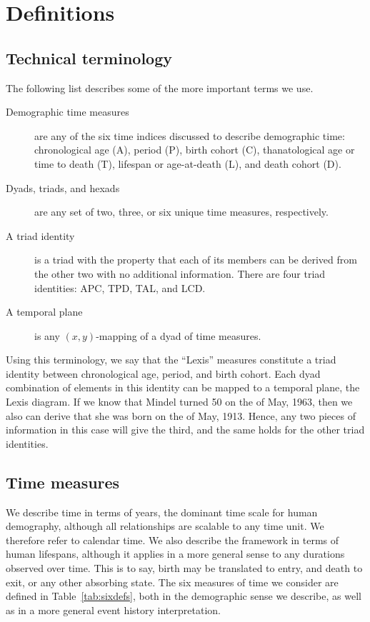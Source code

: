 \documentclass[12pt,oneside,a4paper,doublespacing]{article} %
\theoremstyle{definition}
\begin{document}
\section{Definitions}
\subsection{Technical terminology}
The following list describes some of the more important terms we use.
\begin{description}
\item[Demographic time measures] are any of the six time indices discussed to
describe demographic time: chronological age (A), period (P), birth cohort (C),
thanatological age or time to death (T), lifespan or age-at-death (L), and death
cohort (D).
\item[Dyads, triads, and hexads] are any set of two, three, or six unique time
measures, respectively.
\item[A triad identity] is a triad with the property that each of its members
can be derived from the other two with no additional information. There are four triad
identities: APC, TPD, TAL, and LCD.
\item[A temporal plane] is any $(x,y)$-mapping of a dyad of time measures.
\end{description}
Using this terminology, we say that the ``Lexis'' measures
constitute a triad identity between chronological age, period, and birth cohort. Each dyad
combination of elements in this identity can be mapped to a
temporal plane, the Lexis diagram. If we know that Mindel turned 50 on the
 of May, 1963, then we also can derive that she was born on the  of
May, 1913. Hence, any two pieces of information in this case will give the
third, and the same holds for the other triad identities.

\FloatBarrier
\subsection{Time measures}
\FloatBarrier
We describe time in terms of years, the dominant time scale for human
demography, although all relationships are scalable to any time unit. We
therefore refer to calendar time. We also describe the framework in terms of
human lifespans, although it applies in a more general sense to any durations observed over time. This is to say, birth may be translated to entry, and death
to exit, or any other absorbing state. The six measures of time we consider are
defined in Table~\ref{tab:sixdefs}, both in the demographic sense we describe, as well as in a more general event history interpretation.
\end{document}
